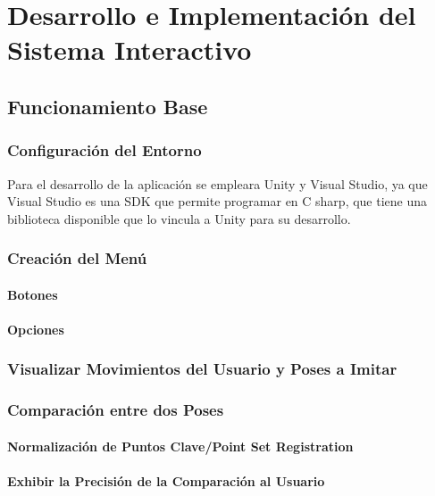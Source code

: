 \chapter{Desarrollo e Implementación del Sistema Interactivo}

\section{Funcionamiento Base}



\subsection{Configuración del Entorno}

Para el desarrollo de la aplicación se empleara Unity y Visual Studio, ya que Visual Studio es una SDK que permite programar en C sharp, que tiene una biblioteca disponible que lo vincula a Unity para su desarrollo.

\subsection{Creación del Menú}

\subsubsection{Botones}

\subsubsection{Opciones}

\subsection{Visualizar Movimientos del Usuario y Poses a Imitar}

\subsection{Comparación entre dos Poses}

\subsubsection{Normalización de Puntos Clave/Point Set Registration}

\subsubsection{Exhibir la Precisión de la Comparación al Usuario}

